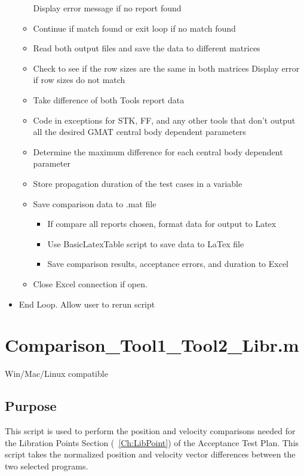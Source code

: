 \begin{itemize}
\begin{itemize}
            \subitem Display error message if no report found
        \item Continue if match found or exit loop if no match found
        \item Read both output files and save the data to different matrices
        \item Check to see if the row sizes are the same in
        both matrices
            \subitem Display error if row sizes do not match
        \item Take difference of both Tools report data
        \item Code in exceptions for STK, FF, and any other tools
        that don't output all the desired GMAT central body
        dependent parameters
        \item Determine the maximum difference for each central body
        dependent parameter
        \item Store propagation duration of the test cases in a
        variable
        \item Save comparison data to .mat file
        \begin{itemize}
            \item If compare all reports chosen, format data for
            output to Latex
            \item Use BasicLatexTable script to save data to LaTex
            file
            \item Save comparison results, acceptance errors, and
            duration to Excel
        \end{itemize}
        \item Close Excel connection if open.
    \end{itemize}
    \item End Loop. Allow user to rerun script
\end{itemize}

\section{Comparison\_Tool1\_Tool2\_Libr.m}
Win/Mac/Linux compatible
\subsection{Purpose}
This script is used to perform the position and velocity comparisons
needed for the Libration Points Section (~\ref{Ch:LibPoint}) of the
Acceptance Test Plan. This script takes the normalized position and
velocity vector differences between the two selected programs.

